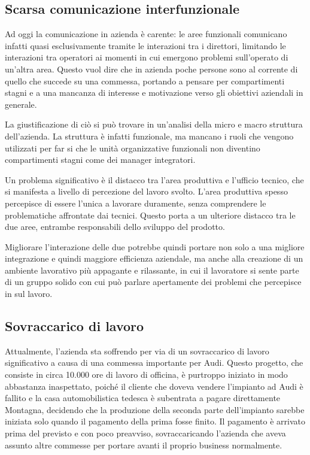 \begin{multicols}{2}
\subsection{Scarsa comunicazione interfunzionale}
	Ad oggi la comunicazione in azienda è carente: le aree funzionali comunicano infatti quasi esclusivamente tramite le interazioni tra i direttori, limitando le interazioni tra operatori ai momenti in cui emergono problemi sull’operato di un’altra area.
	Questo vuol dire che in azienda poche persone sono al corrente di quello che succede su una commessa, portando a pensare per compartimenti stagni e a una mancanza di interesse e motivazione verso gli obiettivi aziendali in generale.

    La giustificazione di ciò si può trovare in un'analisi della micro e macro struttura dell'azienda. La struttura è infatti funzionale, ma mancano i ruoli che vengono utilizzati per far si che le unità organizzative funzionali non diventino compartimenti stagni come dei manager integratori.

	Un problema significativo è il distacco tra l’area produttiva e l’ufficio tecnico, che si manifesta a livello di percezione del lavoro svolto. L’area produttiva spesso percepisce di essere l’unica a lavorare duramente, senza comprendere le problematiche affrontate dai tecnici. Questo porta a un ulteriore distacco tra le due aree, entrambe responsabili dello sviluppo del prodotto.

	Migliorare l’interazione delle due potrebbe quindi portare non solo a una migliore integrazione e quindi maggiore efficienza aziendale, ma anche alla creazione di un ambiente lavorativo più appagante e rilassante, in cui il lavoratore si sente parte di un gruppo solido con cui può parlare apertamente dei problemi che percepisce in sul lavoro.


\subsection{Sovraccarico di lavoro}
  Attualmente, l'azienda sta soffrendo per via di un sovraccarico di lavoro significativo a causa di una commessa importante per Audi.
  Questo progetto, che consiste in circa 10.000 ore di lavoro di officina, è purtroppo iniziato in modo abbastanza inaspettato, poiché il cliente che doveva vendere l'impianto ad Audi è fallito e la casa automobilistica tedesca è subentrata a pagare direttamente Montagna, decidendo che la  produzione della seconda parte dell'impianto sarebbe iniziata solo quando il pagamento della prima fosse finito. 
  Il pagamento è arrivato prima del previsto e con poco preavviso, sovraccaricando l'azienda che aveva assunto altre commesse per portare avanti il proprio business normalmente. 


\end{multicols}
